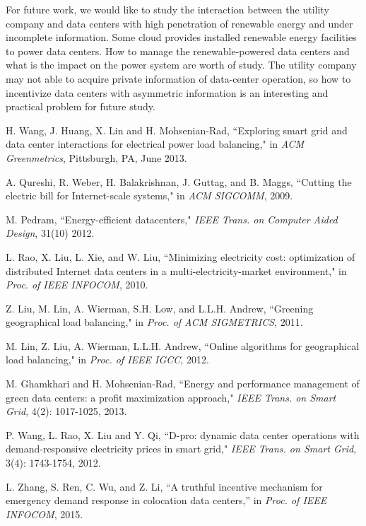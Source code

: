 \documentclass[journal]{IEEEtran}
\begin{document}
	For future work, we would like to study the interaction between the utility company and data centers with high penetration of renewable energy and under incomplete information. Some cloud provides installed renewable energy facilities to power data centers. How to manage the renewable-powered data centers and what is the impact on the power system are worth of study. The utility company may not able to acquire private information of data-center operation, so how to incentivize data centers with asymmetric information is an interesting and practical problem for future study.
	
	\begin{thebibliography}{1}
		H. Wang, J. Huang, X. Lin and H. Mohsenian-Rad, ``Exploring smart grid and data center interactions for electrical power load balancing," in {\it ACM Greenmetrics}, Pittsburgh, PA, June 2013.
		
		A. Qureshi, R. Weber, H. Balakrishnan, J. Guttag, and B. Maggs, ``Cutting the electric bill for Internet-scale systems," in {\it ACM SIGCOMM}, 2009.
		
		M. Pedram, ``Energy-efficient datacenters," {\it IEEE Trans. on Computer Aided Design}, 31(10) 2012.
		
		L. Rao, X. Liu, L. Xie, and W. Liu, ``Minimizing electricity cost: optimization of distributed Internet data centers in a multi-electricity-market environment," in {\it Proc. of IEEE INFOCOM}, 2010.
		
		Z. Liu, M. Lin, A. Wierman, S.H. Low, and L.L.H. Andrew, ``Greening geographical load balancing," in {\it Proc. of ACM SIGMETRICS}, 2011.
		
		M. Lin, Z. Liu, A. Wierman, L.L.H. Andrew, ``Online algorithms for geographical load balancing," in {\it Proc. of IEEE IGCC}, 2012.
		
		M. Ghamkhari and H. Mohsenian-Rad, ``Energy and performance management of green data centers: a profit maximization approach," {\it IEEE Trans. on Smart Grid}, 4(2): 1017-1025, 2013.
		
		P. Wang, L. Rao, X. Liu and Y. Qi, ``D-pro: dynamic data center operations with demand-responsive electricity prices in smart grid," {\it IEEE Trans. on Smart Grid}, 3(4): 1743-1754, 2012.
		
		L. Zhang, S. Ren, C. Wu, and Z. Li, ``A truthful incentive mechanism for emergency demand response in colocation data centers,'' in {\it Proc. of IEEE INFOCOM}, 2015.
				

\end{thebibliography}
\end{document}
